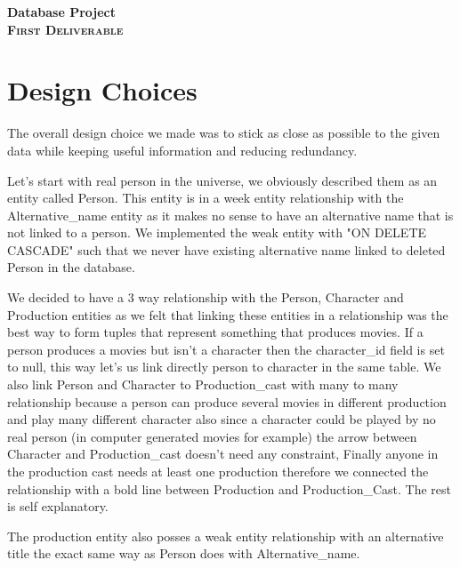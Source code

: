 \documentclass{article}
\begin{document}
\begin{center}
    \huge \bfseries Database Project \\[0.5cm]
    \textsc{\LARGE First Deliverable}\\[1.5cm]
\end{center}

\section{Design Choices}

\par The overall design choice we made was to stick as close as possible to the given data while keeping useful information and reducing redundancy.
\vspace{3mm}

\par Let's start with real person in the universe, we obviously described them as an entity called Person. This entity is in a week entity relationship with the Alternative\_name entity as it makes no sense to have an alternative name that is not linked to a person. We implemented the weak entity with "ON DELETE CASCADE" such that we never have existing alternative name linked to deleted Person in the database.
\vspace{3mm}

\par We decided to have a 3 way relationship with the Person, Character and Production entities as we felt that linking these entities in a relationship was the best way to form tuples that represent something that produces movies. If a person produces a movies but isn't a character then the character\_id field is set to null, this way let's us link directly person to character in the same table. We also link Person and Character to Production\_cast with many to many relationship because a person can produce several movies in different production and play many different character also since a character could be played by no real person (in computer generated movies for example) the arrow between Character and Production\_cast doesn't need any constraint, Finally anyone in the production cast needs at least one production therefore we connected the relationship with a bold line between Production and Production\_Cast. The rest is self explanatory.
\vspace{3mm}

\par The production entity also posses a weak entity relationship with an alternative title the exact same way as Person does with Alternative\_name.
\vspace{3mm}
\end{document}
